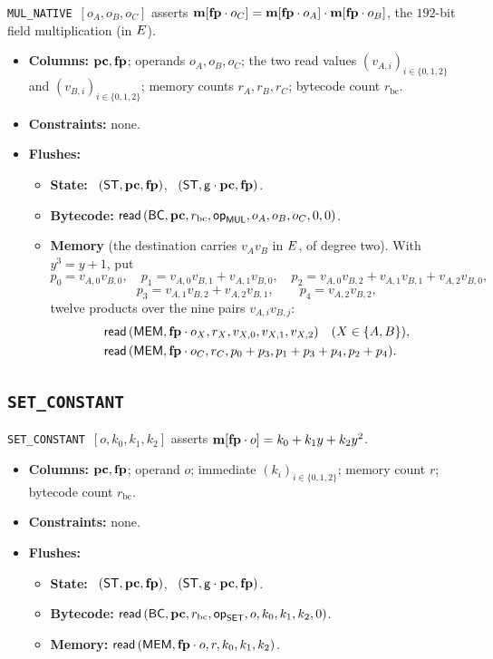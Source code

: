 \texttt{MUL\_NATIVE}\ $[o_A,o_B,o_C]$ asserts $\mathbf{m}[\mathbf{fp}\cdot o_C]=\mathbf{m}[\mathbf{fp}\cdot o_A] \cdot \mathbf{m}[\mathbf{fp}\cdot o_B]$, the $192$-bit field multiplication (in $E$).
\begin{itemize}
\item \textbf{Columns:} $\mathbf{pc},\mathbf{fp}$; operands $o_A,o_B,o_C$; the two read values $(v_{A,i})_{i\in\{0,1,2\}}$ and $(v_{B,i})_{i\in\{0,1,2\}}$; memory counts $r_A,r_B,r_C$; bytecode count $r_{\mathrm{bc}}$.
\item \textbf{Constraints:} none.
\item \textbf{Flushes:}
  \begin{itemize}
  \item \textbf{State:} \pull\ $( \mathsf{ST},\mathbf{pc},\mathbf{fp} )$, \push\ $( \mathsf{ST},\mathsf{g}\cdot\mathbf{pc},\mathbf{fp} )$.
  \item \textbf{Bytecode:} $\mathsf{read}\,( \mathsf{BC},\mathbf{pc},r_{\mathrm{bc}},\mathsf{op}_{\mathsf{MUL}},o_A,o_B,o_C,0,0 )$.
  \item \textbf{Memory} (the destination carries $v_Av_B$ in $E$, of degree two). With $y^3=y+1$, put
    \[
    p_0=v_{A,0}v_{B,0},\quad
    p_1=v_{A,0}v_{B,1}+v_{A,1}v_{B,0},\quad
    p_2=v_{A,0}v_{B,2}+v_{A,1}v_{B,1}+v_{A,2}v_{B,0},
    \]
    \[
    p_3=v_{A,1}v_{B,2}+v_{A,2}v_{B,1},\qquad
    p_4=v_{A,2}v_{B,2},
    \]
    twelve products over the nine pairs $v_{A,i}v_{B,j}$:
    \begin{align*}
      &\mathsf{read}\,( \mathsf{MEM},\mathbf{fp}\cdot o_X,r_X,v_{X,0},v_{X,1},v_{X,2} )\quad(X\in\{A,B\}),\\
      &\mathsf{read}\,( \mathsf{MEM},\mathbf{fp}\cdot o_C,r_C,p_0+p_3,p_1+p_3+p_4,p_2+p_4 ).
    \end{align*}
  \end{itemize}
\end{itemize}

\subsection{\texttt{SET\_CONSTANT}}\label{sec:tab-set}

\texttt{SET\_CONSTANT}\ $[o,k_0,k_1,k_2]$ asserts $\mathbf{m}[\mathbf{fp}\cdot o]=k_0+k_1y+k_2y^{2}$.
\begin{itemize}
\item \textbf{Columns:} $\mathbf{pc},\mathbf{fp}$; operand $o$; immediate $(k_i)_{i\in\{0,1,2\}}$; memory count $r$; bytecode count $r_{\mathrm{bc}}$.
\item \textbf{Constraints:} none.
\item \textbf{Flushes:}
  \begin{itemize}
  \item \textbf{State:} \pull\ $( \mathsf{ST},\mathbf{pc},\mathbf{fp} )$, \push\ $( \mathsf{ST},\mathsf{g}\cdot\mathbf{pc},\mathbf{fp} )$.
  \item \textbf{Bytecode:} $\mathsf{read}\,( \mathsf{BC},\mathbf{pc},r_{\mathrm{bc}},\mathsf{op}_{\mathsf{SET}},o,k_0,k_1,k_2,0 )$.
  \item \textbf{Memory:} $\mathsf{read}\,( \mathsf{MEM},\mathbf{fp}\cdot o,r,k_0,k_1,k_2 )$.
  \end{itemize}
\end{itemize}

